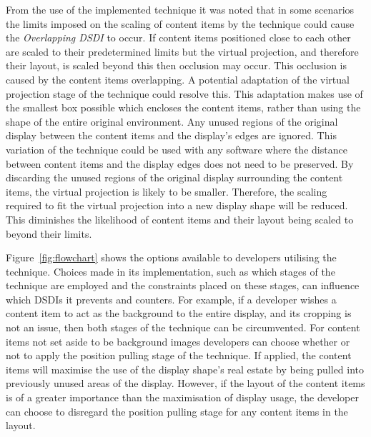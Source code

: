 \documentclass{bmcart}
\begin{document}
From the use of the implemented technique it was noted that in some scenarios the limits imposed on the scaling of content items by the technique could cause the {\emph{Overlapping \ac{DSDI}}} to occur.
If content items positioned close to each other are scaled to their predetermined limits but the virtual projection, and therefore their layout, is scaled beyond this then occlusion may occur.
This occlusion is caused by the content items overlapping.
A potential adaptation of the virtual projection stage of the technique could resolve this.  
This adaptation makes use of the smallest box possible which encloses the content items, rather than using the shape of the entire original environment.
Any unused regions of the original display between the content items and the display's edges are ignored.
This variation of the technique could be used with any software where the distance between content items and the display edges does not need to be preserved.
By discarding the unused regions of the original display surrounding the content items, the virtual projection is likely to be smaller.
Therefore, the scaling required to fit the virtual projection into a new display shape will be reduced.
This diminishes the likelihood of content items and their layout being scaled to beyond their limits. 

Figure~\ref{fig:flowchart} shows the options available to developers utilising the technique.
Choices made in its implementation, such as which stages of the technique are employed and the constraints placed on these stages, can influence which \acp{DSDI} it prevents and counters.
For example, if a developer wishes a content item to act as the background to the entire display, and its cropping is not an issue, then both stages of the technique can be circumvented.
For content items not set aside to be background images developers can choose whether or not to apply the position pulling stage of the technique.
If applied, the content items will maximise the use of the display shape's real estate by being pulled into previously unused areas of the display.
However, if the layout of the content items is of a greater importance than the maximisation of display usage, the developer can choose to disregard the position pulling stage for any content items in the layout.
\end{document}
